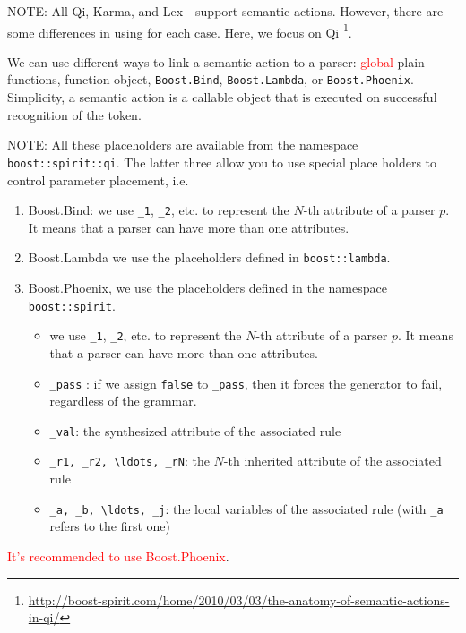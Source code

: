NOTE: All Qi, Karma, and Lex - support semantic actions. However, there are
some differences in using for each case. Here, we focus on Qi
\footnote{\url{http://boost-spirit.com/home/2010/03/03/the-anatomy-of-semantic-actions-in-qi/}}.

We can use different ways to link a semantic action to a parser:
\textcolor{red}{global} plain functions, function object, \verb!Boost.Bind!,
\verb!Boost.Lambda!, or \verb!Boost.Phoenix!.  Simplicity, a semantic action is
a callable object that is executed on successful recognition of the token.

NOTE: All these placeholders are available from the namespace 
\verb!boost::spirit::qi!. The latter three allow you to use special place
holders to control parameter placement, i.e.
\begin{enumerate}
  \item Boost.Bind: we use \verb!_1!, \verb!_2!, etc. to represent the $N$-th
  attribute of a parser $p$. It means that a parser can have more than one
  attributes.
  \item Boost.Lambda we use the placeholders defined in \verb!boost::lambda!.
  \item Boost.Phoenix, we use the placeholders defined in the namespace
  \verb!boost::spirit!.
  \begin{itemize}
    \item we use \verb!_1!, \verb!_2!, etc. to represent the $N$-th
  attribute of a parser $p$. It means that a parser can have more than one
  attributes.
    \item \verb!_pass! : if we assign \verb!false! to \verb!_pass!, then it
    forces the generator to fail, regardless of the grammar.
    
    \item \verb!_val!: the synthesized attribute of the associated rule
    \item \verb!_r1, _r2, \ldots, _rN!: the $N$-th inherited attribute of the
    associated rule
    \item \verb!_a, _b, \ldots, _j!: the local variables of the associated rule
    (with \verb!_a! refers to the first one)
  \end{itemize} 
\end{enumerate}
\textcolor{red}{It's recommended to use Boost.Phoenix}.


